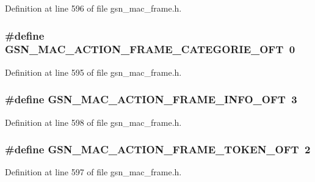 Definition at line 596 of file gsn\_\-mac\_\-frame.h.

\hypertarget{a00523_a9314f0bfe7375c48649ff1e049f6dd0f}{
\subsubsection[{GSN\_\-MAC\_\-ACTION\_\-FRAME\_\-CATEGORIE\_\-OFT}]{\setlength{\rightskip}{0pt plus 5cm}\#define GSN\_\-MAC\_\-ACTION\_\-FRAME\_\-CATEGORIE\_\-OFT~0}}
\label{a00523_a9314f0bfe7375c48649ff1e049f6dd0f}


Definition at line 595 of file gsn\_\-mac\_\-frame.h.

\hypertarget{a00523_a1ee0e3e172df88bda9fe621b016617e9}{
\subsubsection[{GSN\_\-MAC\_\-ACTION\_\-FRAME\_\-INFO\_\-OFT}]{\setlength{\rightskip}{0pt plus 5cm}\#define GSN\_\-MAC\_\-ACTION\_\-FRAME\_\-INFO\_\-OFT~3}}
\label{a00523_a1ee0e3e172df88bda9fe621b016617e9}


Definition at line 598 of file gsn\_\-mac\_\-frame.h.

\hypertarget{a00523_ac0811da81b1789bb7cf7385838c992c8}{
\subsubsection[{GSN\_\-MAC\_\-ACTION\_\-FRAME\_\-TOKEN\_\-OFT}]{\setlength{\rightskip}{0pt plus 5cm}\#define GSN\_\-MAC\_\-ACTION\_\-FRAME\_\-TOKEN\_\-OFT~2}}
\label{a00523_ac0811da81b1789bb7cf7385838c992c8}


Definition at line 597 of file gsn\_\-mac\_\-frame.h.

